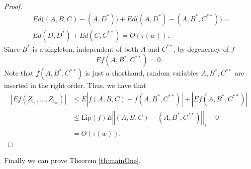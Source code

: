 \documentclass{article} %
\newtheorem{Theorem}{Theorem}
\newcommand{\ev}{E}
\begin{document}
\begin{proof}
\begin{align*}
&\ev d \big( (A,B,C) - (A,D^*)\big) + \ev d\big((A,D^*) - (A,B^*,C^{**}) \big) =\\
&\ev d(D,D^*) + \ev d(C,C^{**}) = O(\tau(w)).
\end{align*}
Since $B^{*}$ is a singleton, independent of both $A$ and $C^{**}$, by degeneracy of $f$  
\begin{equation}
\ev f(A,B^{*},C^{**})=0.\label{eq: ABCLemma_property2}
\end{equation}
Note that $ f(A,B^{*},C^{**})$ is just a shorthand, random variables $A,B^{*},C^{**}$ are  inserted in the right order. Thus, we have that
\begin{align*}
\left|\ev f\left(Z_{i_{1}},\ldots,Z_{i_{m}}\right)\right| & \leq  \ev \left|f\left(A,B,C\right)-f\left(A,B^{*},C^{**}\right)\right|+\left|\ev f(A,B^{*},C^{**})\right|\\
 & \leq  \text{Lip}(f)\ev \left\Vert \left(A,B,C\right)-\left(A,B^{*},C^{**}\right)\right\Vert _{1}+0\\
&= O(\tau(w)).
\end{align*}
\end{proof}

Finally we can prove   Theorem \ref{th:mainOne}. 

\end{document}
